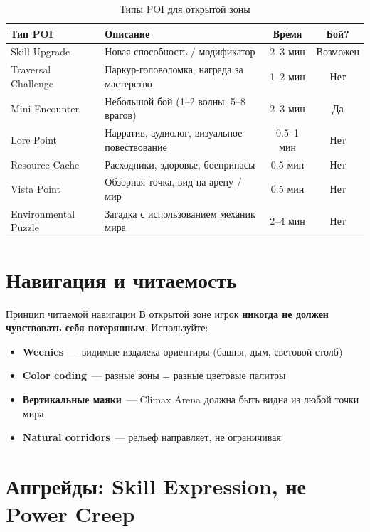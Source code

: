\documentclass[a4paper,11pt]{report}
\begin{document}
\begin{table}[H]
\centering
\caption{Типы POI для открытой зоны}
\begin{tabularx}{\textwidth}{@{}lXcc@{}}
\toprule
\textbf{Тип POI} & \textbf{Описание} & \textbf{Время} & \textbf{Бой?} \\
\midrule
Skill Upgrade & Новая способность / модификатор & 2--3 мин & Возможен \\
Traversal Challenge & Паркур-головоломка, награда за мастерство & 1--2 мин & Нет \\
Mini-Encounter & Небольшой бой (1--2 волны, 5--8 врагов) & 2--3 мин & Да \\
Lore Point & Нарратив, аудиолог, визуальное повествование & 0.5--1 мин & Нет \\
Resource Cache & Расходники, здоровье, боеприпасы & 0.5 мин & Нет \\
Vista Point & Обзорная точка, вид на арену / мир & 0.5 мин & Нет \\
Environmental Puzzle & Загадка с использованием механик мира & 2--4 мин & Нет \\
\bottomrule
\end{tabularx}
\end{table}

\section{Навигация и читаемость}

\begin{principle}{Принцип читаемой навигации}
В открытой зоне игрок \textbf{никогда не должен чувствовать себя
потерянным}. Используйте:
\begin{itemize}
  \item \textbf{Weenies}~--- видимые издалека ориентиры
    (башня, дым, световой столб)
  \item \textbf{Color coding}~--- разные зоны = разные цветовые палитры
  \item \textbf{Вертикальные маяки}~--- Climax Arena должна быть
    видна из любой точки мира
  \item \textbf{Natural corridors}~--- рельеф направляет, не ограничивая
\end{itemize}
\end{principle}

\section{Апгрейды: Skill Expression, не Power Creep}
\end{document}
